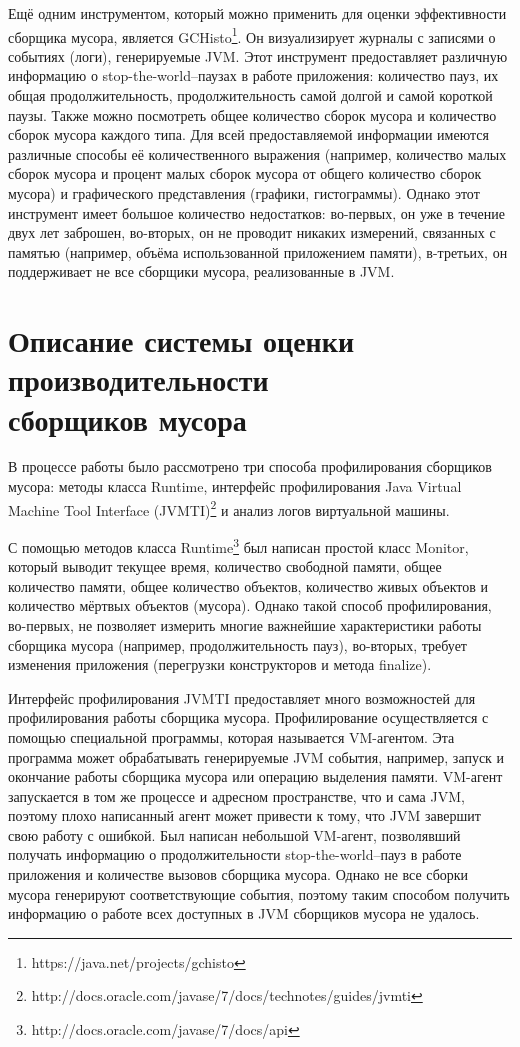 Ещё одним инструментом, который можно применить для оценки эффективности сборщика мусора,
является GCHisto\footnote{https://java.net/projects/gchisto}. Он визуализирует журналы
с записями о событиях (логи), генерируемые JVM. Этот инструмент предоставляет различную 
информацию о stop-the-world--паузах в работе приложения: количество пауз, их общая продолжительность,
продолжительность самой долгой и самой короткой паузы. Также можно посмотреть общее количество
сборок мусора и количество сборок мусора каждого типа. Для всей предоставляемой информации
имеются различные способы её количественного выражения (например, количество малых сборок мусора
и процент малых сборок мусора от общего количество сборок мусора) и графического представления
(графики, гистограммы). Однако этот инструмент имеет большое количество недостатков:
во-первых, он уже в течение двух лет заброшен, во-вторых, он не проводит никаких
измерений, связанных с памятью (например, объёма использованной приложением памяти), в-третьих,
он поддерживает не все сборщики мусора, реализованные в JVM.

\section{Описание системы оценки производительности\\сборщиков мусора}

В процессе работы было рассмотрено три способа профилирования сборщиков мусора:
методы класса Runtime, интерфейс профилирования Java Virtual Machine Tool Interface
(JVMTI)\footnote{http://docs.oracle.com/javase/7/docs/technotes/guides/jvmti} и анализ
логов виртуальной машины.

С помощью методов класса Runtime\footnote{http://docs.oracle.com/javase/7/docs/api}
был написан простой класс Monitor, который выводит текущее время, количество свободной памяти,
общее количество памяти, общее количество объектов, количество живых объектов и 
количество мёртвых объектов (мусора). Однако такой способ профилирования, во-первых,
не позволяет измерить многие важнейшие характеристики работы сборщика мусора (например, продолжительность
пауз), во-вторых, требует изменения приложения (перегрузки конструкторов и 
метода finalize).

Интерфейс профилирования JVMTI предоставляет много возможностей для профилирования
работы сборщика мусора. Профилирование осуществляется с помощью специальной программы,
которая называется VM-агентом. Эта программа может обрабатывать генерируемые JVM
события, например, запуск и окончание работы сборщика мусора или операцию выделения
памяти. VM-агент запускается в том же процессе и адресном пространстве, что и сама
JVM, поэтому плохо написанный агент может привести к тому, что JVM завершит свою
работу с ошибкой. Был написан небольшой VM-агент, позволявший получать информацию
о продолжительности stop-the-world--пауз в работе приложения и количестве вызовов сборщика
мусора. Однако не все сборки мусора генерируют соответствующие события, поэтому таким способом получить
информацию о работе всех доступных в JVM сборщиков мусора не удалось.

